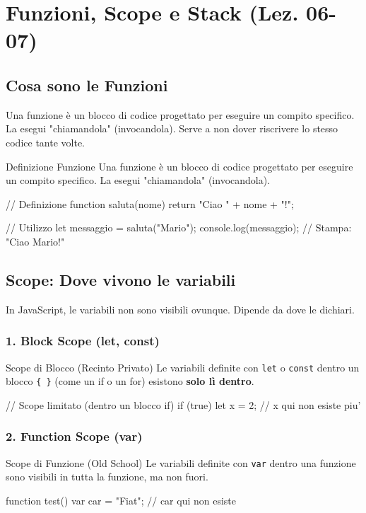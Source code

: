 \section{Funzioni, Scope e Stack (Lez. 06-07)}

\subsection{Cosa sono le Funzioni}
Una funzione è un blocco di codice progettato per eseguire un compito specifico. La esegui "chiamandola" (invocandola).
Serve a non dover riscrivere lo stesso codice tante volte.

\begin{concept}{Definizione Funzione}
Una funzione è un blocco di codice progettato per eseguire un compito specifico. La esegui "chiamandola" (invocandola).
\end{concept}
\begin{jsbox}
// Definizione
function saluta(nome) {
    return "Ciao " + nome + "!";
}

// Utilizzo
let messaggio = saluta("Mario"); 
console.log(messaggio); // Stampa: "Ciao Mario!"
\end{jsbox}

\subsection{Scope: Dove vivono le variabili}
In JavaScript, le variabili non sono visibili ovunque. Dipende da dove le dichiari.

\subsubsection{1. Block Scope (let, const)}
\begin{concept}{Scope di Blocco (Recinto Privato)}
Le variabili definite con \texttt{let} o \texttt{const} dentro un blocco \texttt{\{ \}} (come un if o un for) esistono \textbf{solo lì dentro}.
\end{concept}
\begin{jsbox}
// Scope limitato (dentro un blocco if)
if (true) {
    let x = 2;
}
// x qui non esiste piu'
\end{jsbox}

\subsubsection{2. Function Scope (var)}
\begin{concept}{Scope di Funzione (Old School)}
Le variabili definite con \texttt{var} dentro una funzione sono visibili in tutta la funzione, ma non fuori.
\end{concept}
\begin{jsbox}
function test() {
    var car = "Fiat";
}
// car qui non esiste
\end{jsbox}

